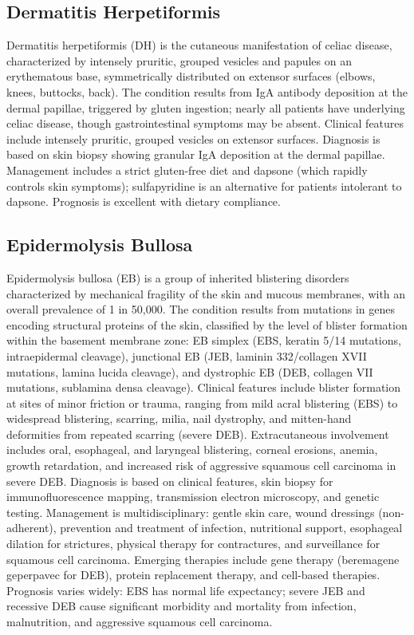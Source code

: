 \subsection{Dermatitis Herpetiformis}
\label{sec:Dermatitis Herpetiformis}
Dermatitis herpetiformis (DH) is the cutaneous manifestation of celiac disease, characterized by intensely pruritic, grouped vesicles and papules on an erythematous base, symmetrically distributed on extensor surfaces (elbows, knees, buttocks, back). The condition results from IgA antibody deposition at the dermal papillae, triggered by gluten ingestion; nearly all patients have underlying celiac disease, though gastrointestinal symptoms may be absent. Clinical features include intensely pruritic, grouped vesicles on extensor surfaces. Diagnosis is based on skin biopsy showing granular IgA deposition at the dermal papillae. Management includes a strict gluten-free diet and dapsone (which rapidly controls skin symptoms); sulfapyridine is an alternative for patients intolerant to dapsone. Prognosis is excellent with dietary compliance.

\subsection{Epidermolysis Bullosa}
\label{sec:Epidermolysis Bullosa}
Epidermolysis bullosa (EB) is a group of inherited blistering disorders characterized by mechanical fragility of the skin and mucous membranes, with an overall prevalence of 1 in 50,000. The condition results from mutations in genes encoding structural proteins of the skin, classified by the level of blister formation within the basement membrane zone: EB simplex (EBS, keratin 5/14 mutations, intraepidermal cleavage), junctional EB (JEB, laminin 332/collagen XVII mutations, lamina lucida cleavage), and dystrophic EB (DEB, collagen VII mutations, sublamina densa cleavage). Clinical features include blister formation at sites of minor friction or trauma, ranging from mild acral blistering (EBS) to widespread blistering, scarring, milia, nail dystrophy, and mitten-hand deformities from repeated scarring (severe DEB). Extracutaneous involvement includes oral, esophageal, and laryngeal blistering, corneal erosions, anemia, growth retardation, and increased risk of aggressive squamous cell carcinoma in severe DEB. Diagnosis is based on clinical features, skin biopsy for immunofluorescence mapping, transmission electron microscopy, and genetic testing. Management is multidisciplinary: gentle skin care, wound dressings (non-adherent), prevention and treatment of infection, nutritional support, esophageal dilation for strictures, physical therapy for contractures, and surveillance for squamous cell carcinoma. Emerging therapies include gene therapy (beremagene geperpavec for DEB), protein replacement therapy, and cell-based therapies. Prognosis varies widely: EBS has normal life expectancy; severe JEB and recessive DEB cause significant morbidity and mortality from infection, malnutrition, and aggressive squamous cell carcinoma.

